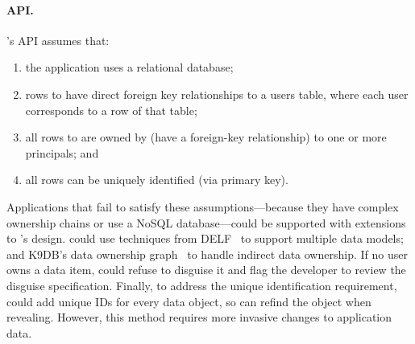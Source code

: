 \paragraph{API.} \sys's API assumes that:
\begin{enumerate}[nosep]
    \item the application uses a relational database;
    \item rows to \xx have direct foreign key relationships to a users table,
    where each user corresponds to a row of that table;
\item all rows to \xx are owned by (have a foreign-key relationship) to one or more principals; and
    \item all rows can be uniquely identified (\eg via primary key).
\end{enumerate}
%
Applications that fail to satisfy these assumptions---\eg because they have
complex ownership chains or use a NoSQL database---could be supported with
extensions to \sys's design. \sys could use techniques from DELF~\cite{delf} to
support multiple data models; 
%
and K9DB's data ownership graph~\cite{k9db} to handle indirect data ownership.
If no user owns a data item, \sys could refuse to disguise it and flag the
developer to review the disguise specification.  
%
Finally, to address the unique identification requirement, \sys could add unique
IDs for every data object, so \sys can refind the object when revealing.
However, this method requires more invasive changes to application data. 
%


